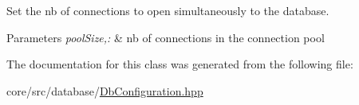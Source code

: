 Set the nb of connections to open simultaneously to the database. 


\begin{DoxyParams}{Parameters}
{\em poolSize,:} & nb of connections in the connection pool \\
\hline
\end{DoxyParams}


The documentation for this class was generated from the following file:\begin{DoxyCompactItemize}
\item 
core/src/database/\hyperlink{DbConfiguration_8hpp}{DbConfiguration.hpp}\end{DoxyCompactItemize}
